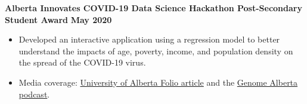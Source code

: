 \documentclass{article}
\begin{document}
\textbf{Alberta Innovates COVID-19 Data Science Hackathon Post-Secondary Student Award} \hfill \textbf{May 2020}
\begin{itemize}
    \item Developed an interactive application using a regression model to better understand the impacts of age, poverty, income, and population density on the spread of the COVID-19 virus.
    \item Media coverage: \href{https://www.folio.ca/students-develop-online-tool-to-predict-covid-19-spread-based-on-demographics/}{University of Alberta Folio article} and the \href{https://genomealberta.ca/genomics/genomics_blog_08182001.aspx}{Genome Alberta podcast}.
\end{itemize}




\end{document}
